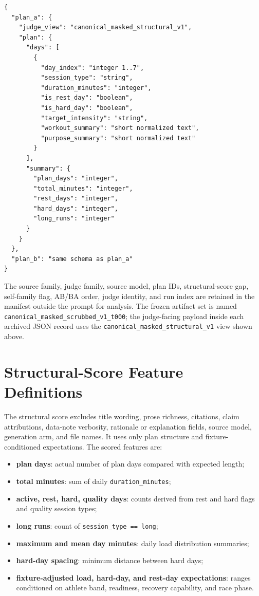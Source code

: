 \begin{lstlisting}
{
  "plan_a": {
    "judge_view": "canonical_masked_structural_v1",
    "plan": {
      "days": [
        {
          "day_index": "integer 1..7",
          "session_type": "string",
          "duration_minutes": "integer",
          "is_rest_day": "boolean",
          "is_hard_day": "boolean",
          "target_intensity": "string",
          "workout_summary": "short normalized text",
          "purpose_summary": "short normalized text"
        }
      ],
      "summary": {
        "plan_days": "integer",
        "total_minutes": "integer",
        "rest_days": "integer",
        "hard_days": "integer",
        "long_runs": "integer"
      }
    }
  },
  "plan_b": "same schema as plan_a"
}
\end{lstlisting}
The source family, judge family, source model, plan IDs, structural-score gap, self-family flag, AB/BA order, judge identity, and run index are retained in the manifest outside the prompt for analysis. The frozen artifact set is named \texttt{canonical\_masked\_scrubbed\_v1\_t000}; the judge-facing payload inside each archived JSON record uses the \texttt{canonical\_masked\_structural\_v1} view shown above.

\section{Structural-Score Feature Definitions}
\label{app:structural-features}
The structural score excludes title wording, prose richness, citations, claim attributions, data-note verbosity, rationale or explanation fields, source model, generation arm, and file names. It uses only plan structure and fixture-conditioned expectations. The scored features are:

\begin{itemize}
  \item \textbf{plan days}: actual number of plan days compared with expected length;
  \item \textbf{total minutes}: sum of daily \texttt{duration\_minutes};
  \item \textbf{active, rest, hard, quality days}: counts derived from rest and hard flags and quality session types;
  \item \textbf{long runs}: count of \texttt{session\_type == long};
  \item \textbf{maximum and mean day minutes}: daily load distribution summaries;
  \item \textbf{hard-day spacing}: minimum distance between hard days;
  \item \textbf{fixture-adjusted load, hard-day, and rest-day expectations}: ranges conditioned on athlete band, readiness, recovery capability, and race phase.
\end{itemize}

